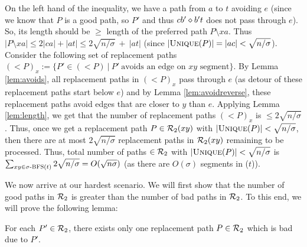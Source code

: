 On the left hand of the inequality, we  have a path from
$a$ to $t$ avoiding $e$ (since we know that $P$ is a good path, so $P'$ and thus $cb' \diamond b't$ does not
pass through $e$). So, its length should be $\ge$
length of the preferred path $P \setminus xa$. Thus $|P
\setminus xa| \le 2|ca|  + |at| \le 2\sqrt {n/\sigma}\
+\ |at|$ (since $|\textsc{Unique}(P)| = |ac| < \sqrt{n/\sigma}$). Consider the following set of replacement paths  $(< P)_x
:= \{P' \in (< P)\ |\ P' \ \text{avoids
an edge on $xy$ segment}\}$. By Lemma \ref{lem:avoids},
all  replacement paths in $(<P)_x$ pass through $e$ (as
detour of these replacement paths start below $e$) and by
Lemma \ref{lem:avoidreverse}, these replacement paths avoid
edges that are closer to $y$ than $e$.
  Applying Lemma \ref{lem:length}, we get
that  the number of replacement paths $(<P)_x$  is $ \le 2\sqrt{n/\sigma}$. Thus, once we
get a replacement path $P \in \mathcal{R}_2(xy)$ with $|\textsc{Unique}(P)| < \sqrt{n /\sigma}$, then there
are at most $2\sqrt{n/\sigma}$ replacement paths in $\mathcal{R}_2(xy)$ remaining to be processed.
Thus, total number of paths $\in \mathcal{R}_2$ with  $|\textsc{Unique}(P)| < \sqrt{n/\sigma}$ is
$\sum_{xy \in \text{$\sigma$-\textsc{BFS}($t$)}} 2\sqrt{n/\sigma} = O(\sqrt{n \sigma})$
(as there are $O(\sigma)$ segments in \SBFS($t$)).\iflong\\\else\vspace{2mm}\fi

\iflong
   
\fi
{}
\label{enum:two}

\noindent We now arrive at our hardest scenario.
We will first show that the number of good paths in $\mathcal{R}_2$
is greater than
the number of bad paths in $\mathcal{R}_2$.
To this end, we will prove the following lemma:
\begin{lemma}
\label{lem:badpaths}
For each $P' \in \mathcal{R}_2$, there exists only one replacement
path $P \in \mathcal{R}_2$ which is bad
due to $P'$.
\end{lemma}

